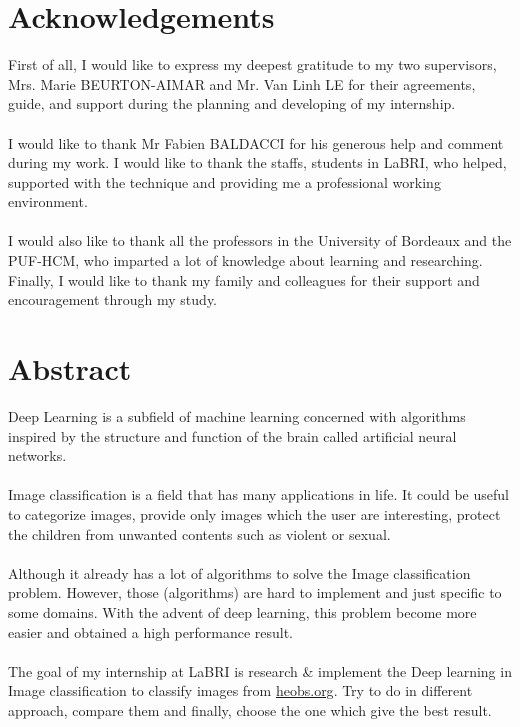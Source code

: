 \documentclass[hidelinks,12pt,a4paper]{report}
\begin{document}
\chapter*{Acknowledgements}

First of all, I would like to express my deepest gratitude to my two supervisors, Mrs. Marie BEURTON-AIMAR and Mr. Van Linh LE for their agreements, guide, and support during the planning and developing of my internship.
\\
\\
I would like to thank Mr Fabien BALDACCI for his generous help and comment during my work. I would like to thank the staffs, students in LaBRI, who helped, supported with the technique and providing me a professional working environment.
\\
\\
I would also like to thank all the professors in the University of Bordeaux and the PUF-HCM, who imparted a lot of knowledge about learning and researching. Finally, I would like to thank my family and colleagues for their support and encouragement through my study.

\clearpage

\chapter*{Abstract}

Deep Learning is a subfield of machine learning concerned with algorithms inspired by the structure and function of the brain called artificial neural networks.
\\
\\
Image classification is a field that has many applications in life. It could be useful to categorize images, provide only images which the user are interesting, protect the children from unwanted contents such as violent or sexual. 
\\
\\
Although it already has a lot of algorithms to solve the Image classification problem. However, those (algorithms) are hard to implement and just specific to some domains. With the advent of deep learning, this problem become more easier and obtained a high performance result\cite{o.a.b.penattik.nogueiraj.a.dossantos2015}.
\\
\\
The goal of my internship at LaBRI is research \& implement the Deep learning in Image classification to classify images from \href{https://heobs.org}{heobs.org}. Try to do in different approach, compare them and finally, choose the one which give the best result.
\tableofcontents
\thispagestyle{empty}
\clearpage
\end{document}

